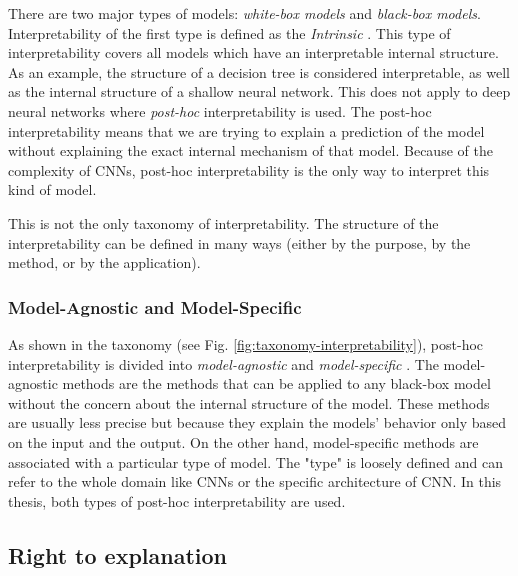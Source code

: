 There are two major types of models: \textit{white-box models} and \textit{black-box models}. Interpretability of the first type is defined as the \textit{Intrinsic} \cite{biran2017explanation}. This type of interpretability covers all models which have an interpretable internal structure. As an example, the structure of a decision tree is considered interpretable, as well as the internal structure of a shallow neural network. This does not apply to deep neural networks where \textit{post-hoc} interpretability is used. The post-hoc interpretability means that we are trying to explain a prediction of the model without explaining the exact internal mechanism of that model. Because of the complexity of CNNs, post-hoc interpretability is the only way to interpret this kind of model.

\begin{remark}
This is not the only taxonomy of interpretability. The structure of the interpretability can be defined in many ways (either by the purpose, by the method, or by the application).
\end{remark}

\subsubsection*{Model-Agnostic and Model-Specific}

As shown in the taxonomy (see Fig. \ref{fig:taxonomy-interpretability}), post-hoc interpretability is divided into \textit{model-agnostic} and \textit{model-specific} \cite{adadi2018peeking}. The model-agnostic methods are the methods that can be applied to any black-box model without the concern about the internal structure of the model. These methods are usually less precise but because they explain the models' behavior only based on the input and the output. On the other hand, model-specific methods are associated with a particular type of model. The "type" is loosely defined and can refer to the whole domain like CNNs or the specific architecture of CNN. In this thesis, both types of post-hoc interpretability are used.

\subsection{Right to explanation}

